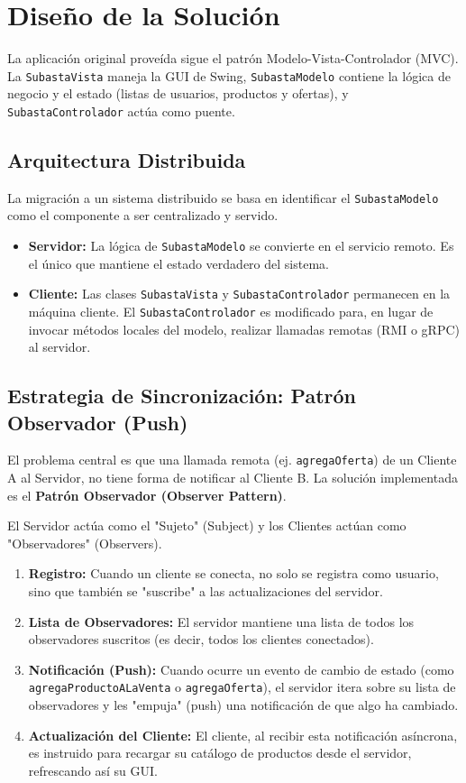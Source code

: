 \documentclass[11pt, a4paper]{article}
\begin{document}
\section{Diseño de la Solución}
\label{sec:diseno}

La aplicación original proveída sigue el patrón Modelo-Vista-Controlador (MVC). La \texttt{SubastaVista} maneja la GUI de Swing, \texttt{SubastaModelo} contiene la lógica de negocio y el estado (listas de usuarios, productos y ofertas), y \texttt{SubastaControlador} actúa como puente.

\subsection{Arquitectura Distribuida}
La migración a un sistema distribuido se basa en identificar el \texttt{SubastaModelo} como el componente a ser centralizado y servido.
\begin{itemize}
    \item \textbf{Servidor:} La lógica de \texttt{SubastaModelo} se convierte en el servicio remoto. Es el único que mantiene el estado verdadero del sistema.
    \item \textbf{Cliente:} Las clases \texttt{SubastaVista} y \texttt{SubastaControlador} permanecen en la máquina cliente. El \texttt{SubastaControlador} es modificado para, en lugar de invocar métodos locales del modelo, realizar llamadas remotas (RMI o gRPC) al servidor.
\end{itemize}

\subsection{Estrategia de Sincronización: Patrón Observador (Push)}
El problema central es que una llamada remota (ej. \texttt{agregaOferta}) de un Cliente A al Servidor, no tiene forma de notificar al Cliente B. La solución implementada es el \textbf{Patrón Observador (Observer Pattern)}.

El Servidor actúa como el "Sujeto" (Subject) y los Clientes actúan como "Observadores" (Observers).
\begin{enumerate}
    \item \textbf{Registro:} Cuando un cliente se conecta, no solo se registra como usuario, sino que también se "suscribe" a las actualizaciones del servidor.
    \item \textbf{Lista de Observadores:} El servidor mantiene una lista de todos los observadores suscritos (es decir, todos los clientes conectados).
    \item \textbf{Notificación (Push):} Cuando ocurre un evento de cambio de estado (como \texttt{agregaProductoALaVenta} o \texttt{agregaOferta}), el servidor itera sobre su lista de observadores y les "empuja" (push) una notificación de que algo ha cambiado.
    \item \textbf{Actualización del Cliente:} El cliente, al recibir esta notificación asíncrona, es instruido para recargar su catálogo de productos desde el servidor, refrescando así su GUI.
\end{enumerate}
\end{document}

